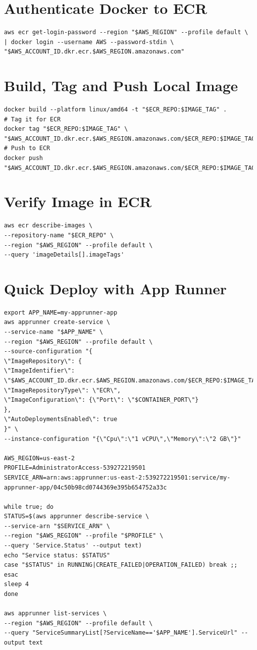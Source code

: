 \section{Authenticate Docker to ECR}
\begin{verbatim}
aws ecr get-login-password --region "$AWS_REGION" --profile default \
| docker login --username AWS --password-stdin \
"$AWS_ACCOUNT_ID.dkr.ecr.$AWS_REGION.amazonaws.com"
\end{verbatim}

\section{Build, Tag and Push Local Image}
\begin{verbatim}
docker build --platform linux/amd64 -t "$ECR_REPO:$IMAGE_TAG" .
# Tag it for ECR
docker tag "$ECR_REPO:$IMAGE_TAG" \
"$AWS_ACCOUNT_ID.dkr.ecr.$AWS_REGION.amazonaws.com/$ECR_REPO:$IMAGE_TAG"
# Push to ECR
docker push "$AWS_ACCOUNT_ID.dkr.ecr.$AWS_REGION.amazonaws.com/$ECR_REPO:$IMAGE_TAG"
\end{verbatim}

\section{Verify Image in ECR}
\begin{verbatim}
aws ecr describe-images \
--repository-name "$ECR_REPO" \
--region "$AWS_REGION" --profile default \
--query 'imageDetails[].imageTags'
\end{verbatim}


\section{Quick Deploy with App Runner}
\begin{verbatim}
export APP_NAME=my-apprunner-app
aws apprunner create-service \
--service-name "$APP_NAME" \
--region "$AWS_REGION" --profile default \
--source-configuration "{
\"ImageRepository\": {
\"ImageIdentifier\": \"$AWS_ACCOUNT_ID.dkr.ecr.$AWS_REGION.amazonaws.com/$ECR_REPO:$IMAGE_TAG\",
\"ImageRepositoryType\": \"ECR\",
\"ImageConfiguration\": {\"Port\": \"$CONTAINER_PORT\"}
},
\"AutoDeploymentsEnabled\": true
}" \
--instance-configuration "{\"Cpu\":\"1 vCPU\",\"Memory\":\"2 GB\"}"

AWS_REGION=us-east-2
PROFILE=AdministratorAccess-539272219501
SERVICE_ARN=arn:aws:apprunner:us-east-2:539272219501:service/my-apprunner-app/04c50b98cd0744369e395b654752a33c

while true; do
STATUS=$(aws apprunner describe-service \
--service-arn "$SERVICE_ARN" \
--region "$AWS_REGION" --profile "$PROFILE" \
--query 'Service.Status' --output text)
echo "Service status: $STATUS"
case "$STATUS" in RUNNING|CREATE_FAILED|OPERATION_FAILED) break ;; esac
sleep 4
done

aws apprunner list-services \
--region "$AWS_REGION" --profile default \
--query "ServiceSummaryList[?ServiceName=='$APP_NAME'].ServiceUrl" --output text
\end{verbatim}

